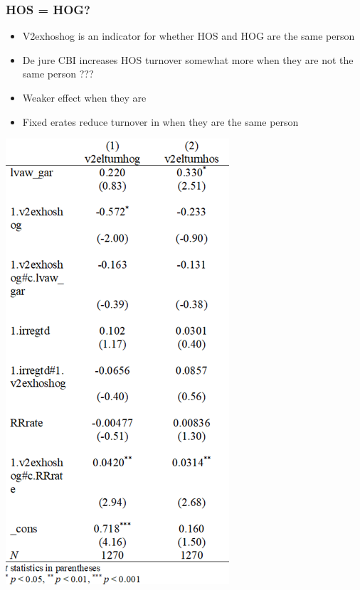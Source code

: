 \documentclass[]{beamer}
\begin{document}
\begin{frame}
\frametitle{HOS = HOG?}
\begin{itemize}
\item V2exhoshog is an indicator for whether HOS and HOG are the same person
\item De jure CBI increases HOS turnover somewhat more when they are not the same person ???
\item Weaker effect when they are
\item Fixed erates reduce turnover in when they are the same person
\end{itemize}
\includegraphics{img0009.png}
\end{frame}
\end{document}

